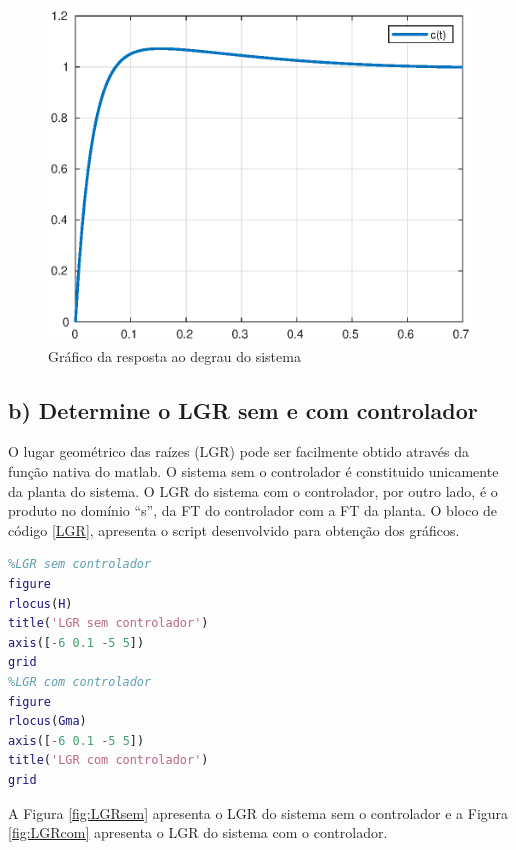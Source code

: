         \begin{figure}[!h]
            \centering
            \includegraphics[width = 0.75\linewidth]{Figuras/ProblemaPID/step.eps}
            \caption{Gráfico da resposta ao degrau do sistema}
            \label{fig1a}        
        \end{figure}
    
    \newpage
    \subsection*{b) Determine o LGR  sem e com controlador}
        O lugar geométrico das raízes (LGR) pode ser facilmente obtido através da função  nativa do matlab. 
        O sistema sem o controlador é constituido unicamente da planta do sistema. O LGR do sistema com o controlador, por outro 
        lado, é o produto no domínio ``s'', da FT do controlador com a FT da planta. O bloco de código \ref{LGR}, apresenta o script
        desenvolvido para obtenção dos gráficos.

        \begin{lstlisting}[language=Matlab,label=LGR,caption=LGRs do sistema]
%% Q b)
%LGR sem controlador
figure
rlocus(H)
title('LGR sem controlador')
axis([-6 0.1 -5 5])
grid
%LGR com controlador
figure
rlocus(Gma)
axis([-6 0.1 -5 5])
title('LGR com controlador')
grid     
        \end{lstlisting}
        
        A Figura \ref{fig:LGRsem} apresenta o LGR do sistema sem o controlador e a Figura \ref{fig:LGRcom} apresenta o LGR do sistema com o controlador. 
        

